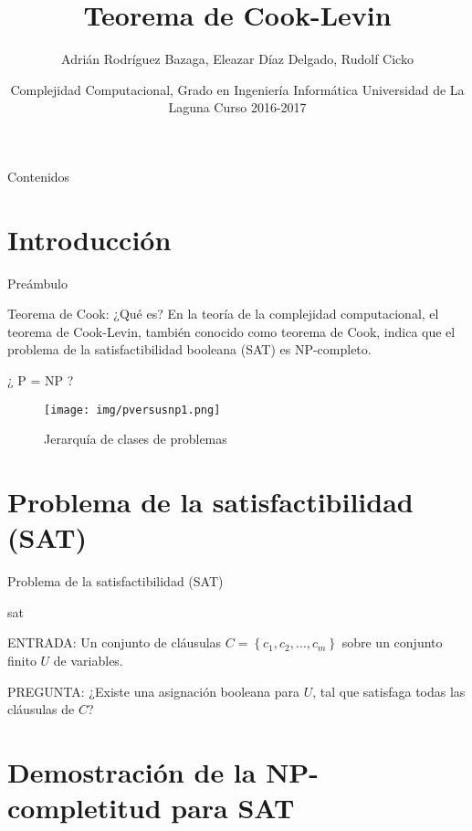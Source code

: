 \documentclass[10pt, mathserif, profesionalfont]{beamer}
\title{Teorema de Cook-Levin}
\author{Adrián Rodríguez Bazaga, Eleazar Díaz Delgado, Rudolf Cicko}
\institute[Universidad de La Laguna]{Adrián Rodríguez Bazaga, Eleazar Díaz Delgado \and Rudolf Cicko} %
\date{Complejidad Computacional, Grado en Ingeniería Informática \newline Universidad de La Laguna \newline Curso 2016-2017}
\begin{document}
\begin{frame}
  \titlepage
\end{frame}

\begin{frame}{Contenidos}
  \tableofcontents
\end{frame}

\section{Introducción}

\begin{frame}{Preámbulo}

\begin{block}{Teorema de Cook: ¿Qué es?}
En la teoría de la complejidad computacional, el teorema de Cook-Levin, también conocido como teorema de Cook, indica que el problema de la satisfactibilidad booleana (SAT) es NP-completo.
\end{block}

\end{frame}

\begin{frame}{¿ P = NP ?}

  \begin{figure}[f]
  \texttt{[image: img/pversusnp1.png]}
  \caption{Jerarquía de clases de problemas}
  \end{figure}

\end{frame}

\section{Problema de la satisfactibilidad (SAT)}

\begin{frame}{Problema de la satisfactibilidad (SAT)}

\begin{block}{\gls{sat}}
{\small
\noindent ENTRADA: Un conjunto de cláusulas $C=\left \{c_1, c_2, \dots, c_m \right \}$ sobre un conjunto finito $U$ de variables.

\noindent PREGUNTA: ¿Existe una asignación booleana para $U$, tal que satisfaga todas las cláusulas de $C$?
}
\end{block}

\end{frame}

\section{Demostración de la NP-completitud para SAT}
\end{document}
